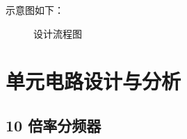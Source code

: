 \documentclass[UTF8,titlepage,a4paper]{ctexart}
\numberwithin{figure}{section}
\begin{document}
示意图如下：

\begin{figure}[H]
\centering
 \caption{设计流程图}
 \label{}
\end{figure}

\clearpage
\section{单元电路设计与分析}

\subsection{10 倍率分频器}
\end{document}
